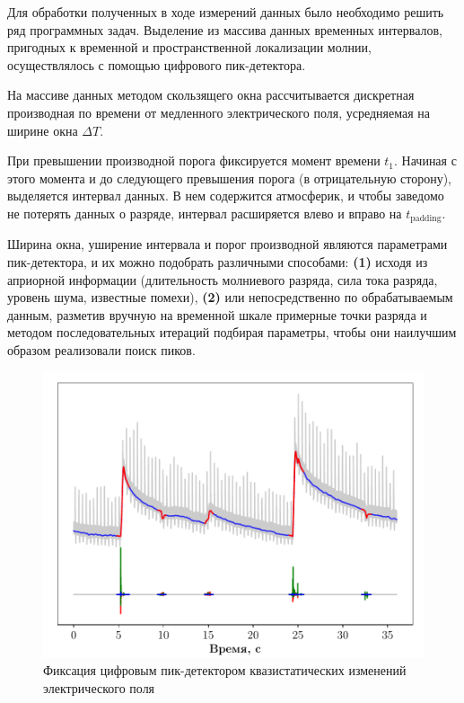 \documentclass[a4paper,14pt]{extarticle}
\begin{document}
Для обработки полученных в ходе измерений данных было необходимо
решить ряд программных задач. Выделение из массива данных
временных интервалов, пригодных к временной и пространственной локализации молнии, осуществлялось с помощью цифрового пик-детектора.

На массиве данных методом скользящего окна \cite{stat} рассчитывается дискретная производная по времени от медленного электрического поля, усредняемая на ширине окна $\Delta T$. 

При превышении производной порога фиксируется момент времени $t_1$. Начиная с этого момента и до следующего превышения порога (в отрицательную сторону), выделяется интервал данных. В нем содержится атмосферик\footnotemark, и чтобы заведомо не потерять данных о разряде, интервал расширяется влево и вправо на $t_\text{padding}$. 

Ширина окна, уширение интервала и порог производной являются параметрами пик-детектора, и их можно  подобрать различными способами: \textbf{(1)} исходя из априорной информации (длительность молниевого разряда, сила тока разряда, уровень шума, известные помехи), \textbf{(2)} или непосредственно по обрабатываемым данным, разметив вручную на временной шкале примерные точки разряда и методом последовательных итераций подбирая параметры, чтобы они наилучшим образом реализовали поиск пиков.

\begin{figure}[h!]
  \centering
  \includegraphics[width=\textwidth,trim={0cm 0cm 0cm 0cm},clip]{fig/peak-detection.pdf}
  \caption{Фиксация цифровым пик-детектором квазистатических
  изменений электрического поля}
  \label{fig:peak-detection}
\end{figure}
\end{document}
